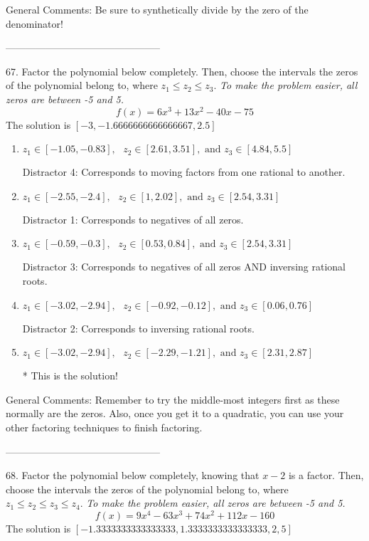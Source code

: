 \documentclass{extbook}[14pt]
\begin{document}
General Comments: Be sure to synthetically divide by the zero of the denominator!

-----------------------------------------------

67. Factor the polynomial below completely. Then, choose the intervals the zeros of the polynomial belong to, where $z_1 \leq z_2 \leq z_3$. \textit{To make the problem easier, all zeros are between -5 and 5.}
\[ f(x) = 6x^{3} +13 x^{2} -40 x -75 \] 
The solution is $ [-3, -1.6666666666666667, 2.5] $ 

\begin{enumerate}[label=\Alph*.] 
\item $ z_1 \in [-1.05, -0.83], \text{   }  z_2 \in [2.61, 3.51], \text{   and   } z_3 \in [4.84, 5.5] $ 

  Distractor 4: Corresponds to moving factors from one rational to another. 
\item $ z_1 \in [-2.55, -2.4], \text{   }  z_2 \in [1, 2.02], \text{   and   } z_3 \in [2.54, 3.31] $ 

  Distractor 1: Corresponds to negatives of all zeros. 
\item $ z_1 \in [-0.59, -0.3], \text{   }  z_2 \in [0.53, 0.84], \text{   and   } z_3 \in [2.54, 3.31] $ 

  Distractor 3: Corresponds to negatives of all zeros AND inversing rational roots. 
\item $ z_1 \in [-3.02, -2.94], \text{   }  z_2 \in [-0.92, -0.12], \text{   and   } z_3 \in [0.06, 0.76] $ 

  Distractor 2: Corresponds to inversing rational roots. 
\item $ z_1 \in [-3.02, -2.94], \text{   }  z_2 \in [-2.29, -1.21], \text{   and   } z_3 \in [2.31, 2.87] $ 

 * This is the solution! 
\end{enumerate} 
 
General Comments: Remember to try the middle-most integers first as these normally are the zeros. Also, once you get it to a quadratic, you can use your other factoring techniques to finish factoring.

-----------------------------------------------

68. Factor the polynomial below completely, knowing that $x-2$ is a factor. Then, choose the intervals the zeros of the polynomial belong to, where $z_1 \leq z_2 \leq z_3 \leq z_4$. \textit{To make the problem easier, all zeros are between -5 and 5.}
\[ f(x) = 9x^{4} -63 x^{3} +74 x^{2} +112 x -160 \] 
The solution is $ [-1.3333333333333333, 1.3333333333333333, 2, 5] $ 
\end{document}
